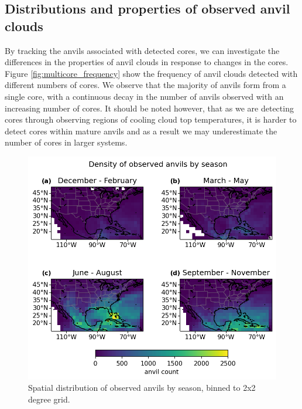 




\subsection{Distributions and properties of observed anvil clouds}

By tracking the anvils associated with detected cores, we can investigate the differences in the properties of anvil clouds in response to changes in the cores.
Figure \ref{fig:multicore_frequency} show the frequency of anvil clouds detected with different numbers of cores.
We observe that the majority of anvils form from a single core, with a continuous decay in the number of anvils observed with an increasing number of cores.
It should be noted however, that as we are detecting cores through observing regions of cooling cloud top temperatures, it is harder to detect cores within mature anvils and as a result we may underestimate the number of cores in larger systems.

\begin{figure}[tp]
    \centering
    \includegraphics[width=\textwidth]{figures/ch2_12.png}
    \caption{Spatial distribution of observed anvils by season, binned to 2x2 degree grid.}
    \label{fig:anvil_distribution_map}
\end{figure}

